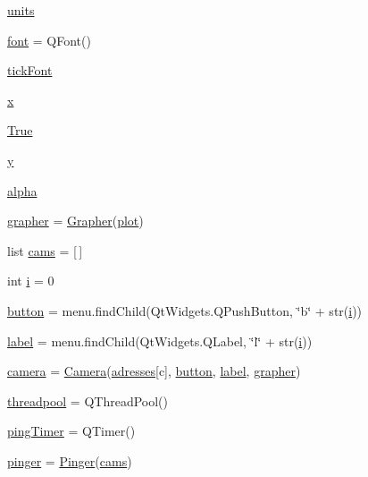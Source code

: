 \begin{DoxyCompactItemize}
\item 
\hyperlink{namespacenetwork__monitor_a093c6a470ae8f02c3ab41f344841d7b4}{units}
\item 
\hyperlink{namespacenetwork__monitor_a3a49c4c8811caddc06b48cb72517bf6a}{font} = Q\+Font()
\item 
\hyperlink{namespacenetwork__monitor_ab5dc49bb32143d840b5617593019b6cc}{tick\+Font}
\item 
\hyperlink{namespacenetwork__monitor_aa6307605f5261f2cc1985c18b1d6b525}{x}
\item 
\hyperlink{namespacenetwork__monitor_a21b2d9df8eef39c146e4d33a4d3ac153}{True}
\item 
\hyperlink{namespacenetwork__monitor_a3d4b2bbe9932d5f533511dd894a99987}{y}
\item 
\hyperlink{namespacenetwork__monitor_a0217c896f3b1258aa8de32cf83f58221}{alpha}
\item 
\hyperlink{namespacenetwork__monitor_a6caf9d5fe8492a62de30cc09eb3d6ee0}{grapher} = \hyperlink{classnetwork__monitor_1_1_grapher}{Grapher}(\hyperlink{namespacenetwork__monitor_a26e25ec561afa4ed83eebb64d67c1b14}{plot})
\item 
list \hyperlink{namespacenetwork__monitor_a7033c08f9dae3f4784ace432524d7c3d}{cams} = \mbox{[}$\,$\mbox{]}
\item 
int \hyperlink{namespacenetwork__monitor_acbaeef9dd38caeac7bfb4ce5cc555a68}{i} = 0
\item 
\hyperlink{namespacenetwork__monitor_a068b20f337cc6bb4d8f773203ba1eb72}{button} = menu.\+find\+Child(Qt\+Widgets.\+Q\+Push\+Button, \char`\"{}b\char`\"{} + str(\hyperlink{namespacenetwork__monitor_acbaeef9dd38caeac7bfb4ce5cc555a68}{i}))
\item 
\hyperlink{namespacenetwork__monitor_a581e75b195d137edaf37a10c8f54f10b}{label} = menu.\+find\+Child(Qt\+Widgets.\+Q\+Label, \char`\"{}l\char`\"{} + str(\hyperlink{namespacenetwork__monitor_acbaeef9dd38caeac7bfb4ce5cc555a68}{i}))
\item 
\hyperlink{namespacenetwork__monitor_a1642786c603ba143d757e407619d4a18}{camera} = \hyperlink{classnetwork__monitor_1_1_camera}{Camera}(\hyperlink{namespacenetwork__monitor_a58f207986e588fcaab74394ee1cf1bcb}{adresses}\mbox{[}c\mbox{]}, \hyperlink{namespacenetwork__monitor_a068b20f337cc6bb4d8f773203ba1eb72}{button}, \hyperlink{namespacenetwork__monitor_a581e75b195d137edaf37a10c8f54f10b}{label}, \hyperlink{namespacenetwork__monitor_a6caf9d5fe8492a62de30cc09eb3d6ee0}{grapher})
\item 
\hyperlink{namespacenetwork__monitor_af27fb18157e68ae57798c807d9a7ee63}{threadpool} = Q\+Thread\+Pool()
\item 
\hyperlink{namespacenetwork__monitor_a6b419aa619e07e27f109ac81f356fbeb}{ping\+Timer} = Q\+Timer()
\item 
\hyperlink{namespacenetwork__monitor_ad064e389b1b0120cadea8ef9d463f2da}{pinger} = \hyperlink{classnetwork__monitor_1_1_pinger}{Pinger}(\hyperlink{namespacenetwork__monitor_a7033c08f9dae3f4784ace432524d7c3d}{cams})
\end{DoxyCompactItemize}


